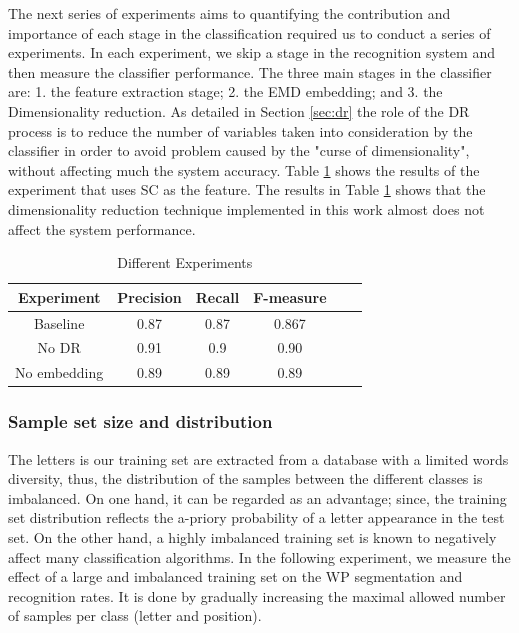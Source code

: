 \documentclass[10pt, conference, compsocconf]{IEEEtran}
\begin{document}
The next series of experiments aims to quantifying the contribution and importance of each stage in the classification required us to conduct a series of experiments.
In each experiment, we skip a stage in the recognition system and then measure the classifier performance.
The three main stages in the classifier are: 1. the feature extraction stage; 2. the EMD embedding; and 3. the Dimensionality reduction.
As detailed in Section \ref{sec:dr} the role of the DR process is to reduce the number of variables taken into consideration by the classifier in order to avoid problem caused by the "curse of dimensionality", without affecting much the system accuracy.
Table \ref{table:dr_embedding_comparison} shows the results of the experiment that uses SC as the feature.
The results in Table \ref{table:dr_embedding_comparison} shows that the dimensionality reduction technique implemented in this work almost does not affect the system performance.


\begin{table}
\centering
\begin{tabular}{ | c | c | c | c | c | c |}
  \hline
  Experiment & Precision & Recall & F-measure\\
  \hline                 
  Baseline &  0.87 & 0.87 & 0.867 \\
  \hline
  No DR & 0.91 & 0.9 & 0.90 \\
  \hline
  No embedding & 0.89 & 0.89 & 0.89 \\
  \hline
\end{tabular}
\caption{Different Experiments}
\label{table:dr_embedding_comparison} 
\end{table}

\subsubsection{Sample set size and distribution}
The letters is our training set are extracted from a database with a limited words diversity, thus, the distribution of the samples between the different classes is imbalanced. 
On one hand, it can be regarded as an advantage; since, the training set distribution reflects the a-priory probability of a letter appearance in the test set. 
On the other hand, a highly imbalanced training set is known to negatively affect many classification algorithms.
In the following experiment, we measure the effect of a large and imbalanced training set on the WP segmentation and recognition rates. 
It is done by gradually increasing the maximal allowed number of samples per class (letter and position).
 
\end{document}
